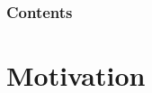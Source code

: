 
\begin{frame}[noframenumbering]
    \addtocounter{framenumber}{-1}
    \backgroundlogo%

    \frametitle{Contents}
    \tableofcontents

\end{frame}

\section{Motivation}

